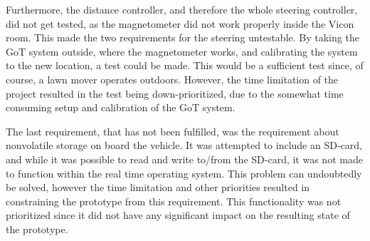 Furthermore, the distance controller, and therefore the whole steering controller, did not get tested, as the magnetometer did not work properly inside the Vicon room. This made the two requirements for the steering untestable. By taking the GoT system outside, where the magnetometer works, and calibrating the system to the new location, a test could be made. This would be a sufficient test since, of course, a lawn mover operates outdoors. However, the time limitation of the project resulted in the test being down-prioritized, due to the somewhat time consuming setup and calibration of the GoT system.

The last requirement, that has not been fulfilled, was the requirement about nonvolatile storage on board the vehicle. It was attempted to include an SD-card, and while it was possible to read and write to/from the SD-card, it was not made to function within the real time operating system. This problem can undoubtedly be solved, however the time limitation and other priorities resulted in constraining the prototype from this requirement. This functionality was not prioritized since it did not have any significant impact on the resulting state of the prototype.
















